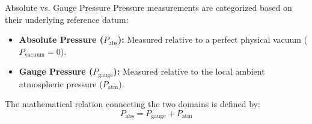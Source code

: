 \begin{defbox}{Absolute vs. Gauge Pressure}
Pressure measurements are categorized based on their underlying reference datum:
\begin{itemize}
    \item \textbf{Absolute Pressure ($P_{\text{abs}}$):} Measured relative to a perfect physical vacuum ($P_{\text{vacuum}} = 0$).
    \item \textbf{Gauge Pressure ($P_{\text{gauge}}$):} Measured relative to the local ambient atmospheric pressure ($P_{\text{atm}}$). 
\end{itemize}
The mathematical relation connecting the two domains is defined by:
\begin{equation}
    P_{\text{abs}} = P_{\text{gauge}} + P_{\text{atm}}
\end{equation}
\end{defbox}